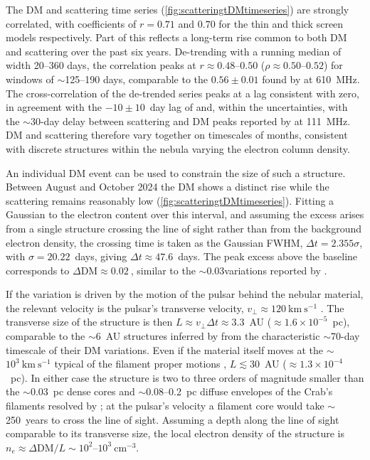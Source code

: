 The DM and scattering time series (\cref{fig:scatteringtDMtimeseries}) are strongly correlated, with coefficients of $r = 0.71$ and $0.70$ for the thin and thick screen models respectively. Part of this reflects a long-term rise common to both DM and scattering over the past six years. De-trending with a running median of width 20--360 days, the correlation peaks at $r \approx 0.48$--$0.50$ ($\rho \approx 0.50$--$0.52$) for windows of $\sim$125--190 days, comparable to the $0.56 \pm 0.01$ found by \cite{mckee_temporal_2018} at 610~MHz. The cross-correlation of the de-trended series peaks at a lag consistent with zero, in agreement with the $-10 \pm 10$~day lag of \cite{mckee_temporal_2018} and, within the uncertainties, with the $\sim$30-day delay between scattering and DM peaks reported by \cite{kuzmin_deviation_2008} at 111~MHz. DM and scattering therefore vary together on timescales of months, consistent with discrete structures within the nebula varying the electron column density.

An individual DM event can be used to constrain the size of such a structure. Between August and October 2024 the DM shows a distinct rise while the scattering remains reasonably low (\cref{fig:scatteringtDMtimeseries}). Fitting a Gaussian to the electron content over this interval, and assuming the excess arises from a single structure crossing the line of sight rather than from the background electron density, the crossing time is taken as the Gaussian FWHM, $\Delta t = 2.355\sigma$, with $\sigma = 20.22$~days, giving $\Delta t \approx 47.6$~days. The peak excess above the baseline corresponds to $\Delta\mathrm{DM} \approx 0.02~$\dm, similar to the $\sim0.03$\dm variations reported by \cite{kuzmin_deviation_2008}.

If the variation is driven by the motion of the pulsar behind the nebular material, the relevant velocity is the pulsar's transverse velocity, $v_\perp \approx 120~\mathrm{km~s^{-1}}$ \citep{kaplan_precise_2008}. The transverse size of the structure is then $L \approx v_\perp \Delta t \approx 3.3$~AU ($\approx 1.6\times10^{-5}$~pc), comparable to the $\sim$6~AU structures inferred by \cite{mckee_temporal_2018} from the characteristic $\sim$70-day timescale of their DM variations. Even if the material itself moves at the $\sim$$10^{3}~\mathrm{km~s^{-1}}$ typical of the filament proper motions \citep{trimble_motions_1968}, $L \lesssim 30$~AU ($\approx 1.3\times10^{-4}$~pc). In either case the structure is two to three orders of magnitude smaller than the $\sim$0.03~pc dense cores and $\sim$0.08--0.2~pc diffuse envelopes of the Crab's filaments resolved by \cite{arias_crab_2025}; at the pulsar's velocity a filament core would take $\sim$250~years to cross the line of sight. Assuming a depth along the line of sight comparable to its transverse size, the local electron density of the structure is $n_e \approx \Delta\mathrm{DM}/L \sim 10^{2}$--$10^{3}~\mathrm{cm^{-3}}$.

